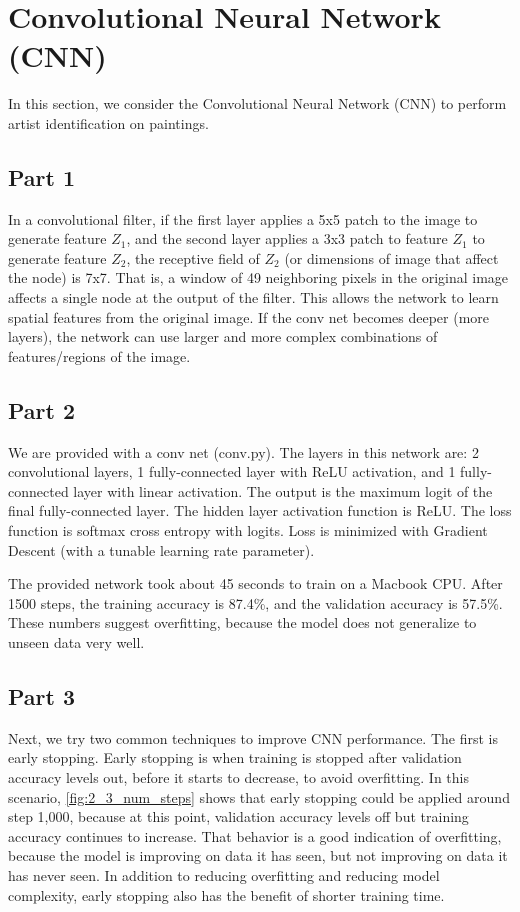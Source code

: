 \section{Convolutional Neural Network (CNN)} \label{sec:prob2}
In this section, we consider the Convolutional Neural Network (CNN) to perform artist identification on paintings.

\subsection{Part 1}
In a convolutional filter, if the first layer applies a 5x5 patch to the image to generate feature $Z_1$, and the second layer applies a 3x3 patch to feature $Z_1$ to generate feature $Z_2$, the receptive field of $Z_2$ (or dimensions of image that affect the node) is 7x7.
That is, a window of 49 neighboring pixels in the original image affects a single node at the output of the filter.
This allows the network to learn spatial features from the original image.
If the conv net becomes deeper (more layers), the network can use larger and more complex combinations of features/regions of the image.

\subsection{Part 2}
We are provided with a conv net (conv.py).
The layers in this network are: 2 convolutional layers, 1 fully-connected layer with ReLU activation, and 1 fully-connected layer with linear activation.
The output is the maximum logit of the final fully-connected layer.
The hidden layer activation function is ReLU.
The loss function is softmax cross entropy with logits.
Loss is minimized with Gradient Descent (with a tunable learning rate parameter).

The provided network took about 45 seconds to train on a Macbook CPU.
After 1500 steps, the training accuracy is 87.4\%, and the validation accuracy is 57.5\%.
These numbers suggest overfitting, because the model does not generalize to unseen data very well.

\subsection{Part 3}
Next, we try two common techniques to improve CNN performance.
The first is early stopping.
Early stopping is when training is stopped after validation accuracy levels out, before it starts to decrease, to avoid overfitting.
In this scenario, \cref{fig:2_3_num_steps} shows that early stopping could be applied around step 1,000, because at this point, validation accuracy levels off but training accuracy continues to increase.
That behavior is a good indication of overfitting, because the model is improving on data it has seen, but not improving on data it has never seen. 
In addition to reducing overfitting and reducing model complexity, early stopping also has the benefit of shorter training time.

